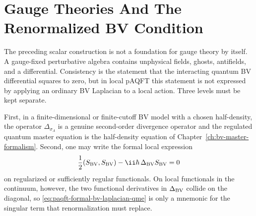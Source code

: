 \section{Gauge Theories And The Renormalized BV Condition}

The preceding scalar construction is not a foundation for gauge theory by
itself.  A gauge-fixed perturbative algebra contains unphysical fields,
ghosts, antifields, and a differential.  Consistency is the statement that
the interacting quantum BV differential squares to zero, but in local pAQFT
this statement is not expressed by applying an ordinary BV Laplacian to a
local action.  Three levels must be kept separate.

First, in a finite-dimensional or finite-cutoff BV model with a chosen
half-density, the operator \(\Delta_{\sigma_\Lambda}\) is a genuine
second-order divergence operator and the regulated quantum master equation is
the half-density equation of Chapter~\ref{ch:bv-master-formalism}.  Second,
one may write the formal local expression
\begin{equation}
  \frac12(S_{\rm BV},S_{\rm BV})-\ii\hbar\,\Delta_{\rm BV}S_{\rm BV}=0
  \label{eq:paqft-formal-bv-laplacian-qme}
\end{equation}
on regularized or sufficiently regular functionals.  On local functionals in
the continuum, however, the two functional derivatives in
\(\Delta_{\rm BV}\) collide on the diagonal, so
\eqref{eq:paqft-formal-bv-laplacian-qme} is only a mnemonic for the singular
term that renormalization must replace.

